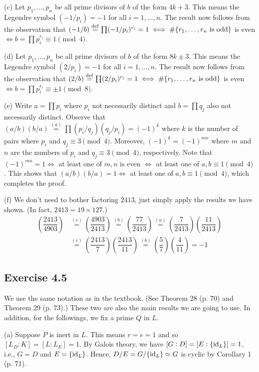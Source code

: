 \documentclass[../Marcus.tex]{subfiles}
\begin{document}
(c) Let $p_1,\ldots,p_n$ be all prime divisors of $b$ of the form $4k+3$. This means the Legendre symbol $(-1/p_i)=-1$ for all $i=1,\ldots,n$. The result now follows from the observation that $(-1/b)\overset{\operatorname{def}}{=}\prod (-1/p_i)^{r_i}=1 \iff \#\{r_1,\ldots,r_n \text{ is odd}\}$ is even $\iff b=\prod p_i^{r_i}\equiv 1\pmod{4}$.

(d) Let $p_1,\ldots,p_n$ be all prime divisors of $b$ of the form $8k\pm3$. This means the Legendre symbol $(2/p_i)=-1$ for all $i=1,\ldots,n$. The result now follows from the observation that $(2/b)\overset{\operatorname{def}}{=}\prod (2/p_i)^{r_i}=1 \iff \#\{r_1,\ldots,r_n \text{ is odd}\}$ is even $\iff b=\prod p_i^{r_i}\equiv \pm1\pmod{8}$.

(e) Write $a=\prod p_i$ where $p_i$ not necessarily distinct and $b=\prod q_j$ also not necessarily distinct. Observe that $(a/b)(b/a)\overset{(a)}{=}\prod (p_i/q_j)(q_j/p_i)=(-1)^k$ where $k$ is the number of pairs where $p_i$ and $q_j\equiv 3\pmod{4}$. Moreover, $(-1)^k=(-1)^{mn}$ where $m$ and $n$ are the numbers of $p_i$ and $q_j\equiv 3\pmod{4}$, respectively. Note that $(-1)^{mn}=1 \iff$ at least one of $m,n$ is even $\iff$ at least one of $a,b\equiv 1\pmod{4}$. This shows that $(a/b)(b/a)=1 \iff$ at least one of $a,b\equiv 1\pmod{4}$, which completes the proof.

(f) We don't need to bother factoring $2413$, just simply apply the results we have shown. (In fact, $2413 = 19\times 127$.)
\begin{align*}
    \left(\dfrac{2413}{4903}\right) &\overset{(e)}{=} \left(\dfrac{4903}{2413}\right) \overset{(b)}{=} \left(\dfrac{77}{2413}\right) \overset{(a)}{=} \left(\dfrac{7}{2413}\right)\left(\dfrac{11}{2413}\right) \\ &\overset{(e)}{=} \left(\dfrac{2413}{7}\right)\left(\dfrac{2413}{11}\right) \overset{(b)}{=} \left(\dfrac{5}{7}\right)\left(\dfrac{4}{11}\right) = -1
\end{align*}

\subsection*{Exercise 4.5}

We use the same notation as in the textbook. (See Theorem 28 (p. 70) and Theorem 29 (p. 73).) These two are also the main results we are going to use. In addition, for the followings, we fix a prime $Q$ in $L$.

(a) Suppose $P$ is inert in $L$. This means $r=e=1$ and so $[L_D:K]=[L:L_E]=1$. By Galois theory, we have $[G:D]=[E:\{\operatorname{id}_L\}]=1$, i.e., $G=D$ and $E=\{\operatorname{id}_L\}$. Hence, $D/E=G/\{\operatorname{id}_L\}\simeq G$ is cyclic by Corollary 1 (p. 71).
\end{document}
